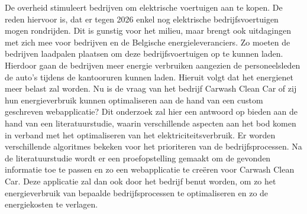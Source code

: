 De overheid stimuleert bedrijven om elektrische voertuigen aan te kopen. De reden hiervoor is, dat er tegen 2026 enkel nog elektrische bedrijfsvoertuigen mogen rondrijden. Dit is gunstig voor het milieu, maar brengt ook uitdagingen met zich mee voor bedrijven en de Belgische energieleveranciers. Zo moeten de bedrijven laadpalen plaatsen om deze bedrijfsvoertuigen op te kunnen laden. Hierdoor gaan de bedrijven meer energie verbruiken aangezien de personeelsleden de auto’s tijdens de kantooruren kunnen laden. Hieruit volgt dat het energienet meer belast zal worden. Nu is de vraag van het bedrijf Carwash Clean Car of zij hun energieverbruik kunnen optimaliseren aan de hand van een custom geschreven webapplicatie? Dit onderzoek zal hier een antwoord op bieden aan de hand van een literatuurstudie, waarin verschillende aspecten aan het bod komen in verband met het optimaliseren van het elektriciteitsverbruik. Er worden verschillende algoritmes bekeken voor het prioriteren van de bedrijfsprocessen. Na de literatuurstudie wordt er een proefopstelling gemaakt om de gevonden informatie toe te passen en zo een webapplicatie te creëren voor Carwash Clean Car. Deze applicatie zal dan ook door het bedrijf benut worden, om zo het energieverbruik van bepaalde bedrijfsprocessen te optimaliseren en zo de energiekosten te verlagen.